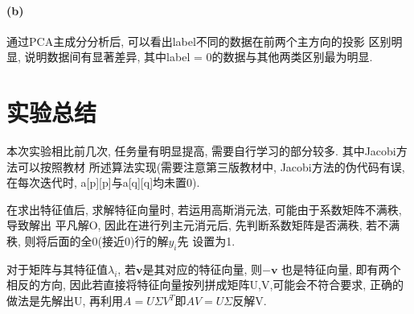 \documentclass[12pt,a4paper,oneside]{article}
\begin{document}
\paragraph{(b)} 通过PCA主成分分析后, 可以看出label不同的数据在前两个主方向的投影
区别明显, 说明数据间有显著差异, 其中label = 0的数据与其他两类区别最为明显.

\section{实验总结}
本次实验相比前几次, 任务量有明显提高, 需要自行学习的部分较多. 其中Jacobi方法可以按照教材
所述算法实现(需要注意第三版教材中, Jacobi方法的伪代码有误, 在每次迭代时, a[p][p]与a[q][q]均未置0).
\par 在求出特征值后, 求解特征向量时, 若运用高斯消元法, 可能由于系数矩阵不满秩, 导致解出
平凡解O, 因此在进行列主元消元后, 先判断系数矩阵是否满秩, 若不满秩, 则将后面的全0(接近0)行的解$y_i$先
设置为1.
\par 对于矩阵与其特征值$\lambda_i$, 若$\boldsymbol{v}$是其对应的特征向量, 则$-\boldsymbol{v}$
也是特征向量, 即有两个相反的方向, 因此若直接将特征向量按列拼成矩阵U,V,可能会不符合要求, 
正确的做法是先解出U, 再利用$A=U\Sigma V^T$即$AV = U\Sigma$反解V.
\end{document}
